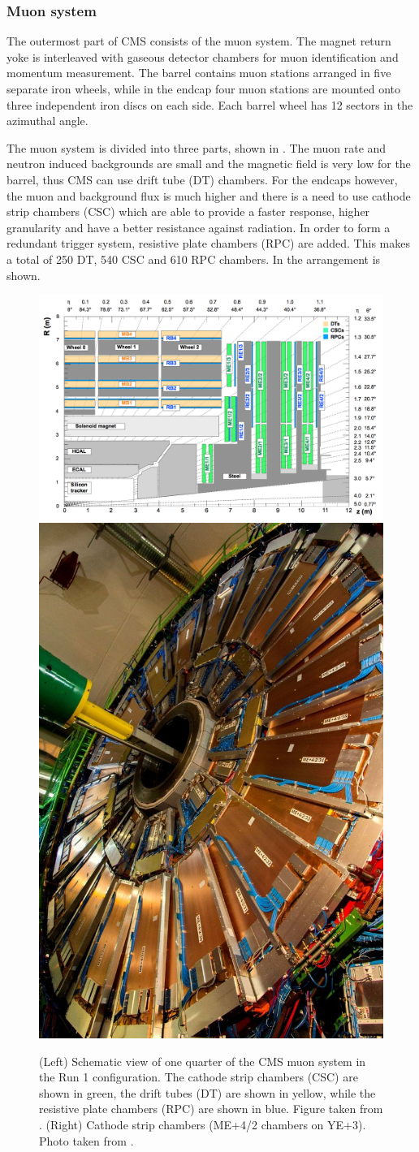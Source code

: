 \clearpage
\subsubsection{Muon system}
\label{sec:MUO}
The outermost part of CMS consists of the muon system. The magnet return yoke is interleaved with gaseous detector chambers for muon identification and momentum measurement. The barrel contains muon stations arranged in five separate iron wheels, while in the endcap four muon stations are mounted onto three independent iron discs on each side. Each barrel wheel has 12 sectors in the azimuthal angle. 

The muon system is divided into three parts, shown in . The muon rate and neutron induced backgrounds are small and the magnetic field is very low for the barrel, thus CMS can use drift tube (DT) chambers. For the endcaps however, the muon and background flux is much higher and there is a need to use cathode strip chambers (CSC) which are able to provide a faster response, higher granularity and have a better resistance against radiation. In order to form a redundant trigger system, resistive plate chambers (RPC) are added. This makes a total of 250 DT, 540 CSC and 610 RPC chambers. In  the arrangement is shown.
\begin{figure}[htbp]
	\centering
	\includegraphics[width=.69\textwidth]{2_ExperimentalSetup/Figures/muonsys}
	\includegraphics[width=0.3\linewidth]{2_ExperimentalSetup/Figures/NfP5131122image6}
	\caption{(Left) Schematic view of one quarter of the CMS muon system in the Run 1 configuration. The cathode strip chambers (CSC) are shown in green, the drift tubes (DT) are shown in yellow, while the resistive plate chambers (RPC) are shown in blue. Figure  taken from \cite{Chatrchyan:1223944}. (Right) Cathode strip chambers (ME+4/2 chambers on YE+3). Photo taken from \cite{muon}.}
	\label{fig:muonsys}
\end{figure}


